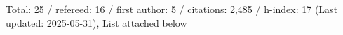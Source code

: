 Total: 25 / refereed: 16 / first author: 5 / citations: 2,485 / h-index: 17 (Last updated: 2025-05-31), List attached below